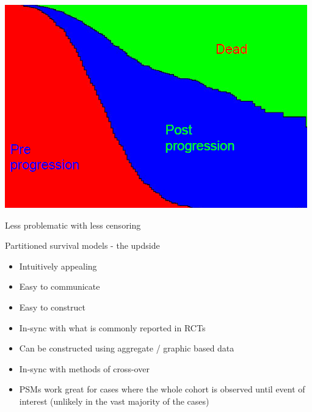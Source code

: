 \documentclass[ignorenonframetext,]{beamer}
\providecommand{\tightlist}{%
  \setlength{\itemsep}{0pt}\setlength{\parskip}{0pt}}
\begin{document}
\begin{frame}

\includegraphics[width=1\linewidth]{figures/psm}

Less problematic with less censoring

\end{frame}

\begin{frame}{Partitioned survival models - the updside}

\begin{itemize}
\tightlist
\item
  Intuitively appealing
\item
  Easy to communicate
\item
  Easy to construct
\item
  In-sync with what is commonly reported in RCTs
\item
  Can be constructed using aggregate / graphic based data
\item
  In-sync with methods of cross-over
\item
  PSMs work great for cases where the whole cohort is observed until
  event of interest (unlikely in the vast majority of the cases)
\end{itemize}

\end{frame}
\end{document}
